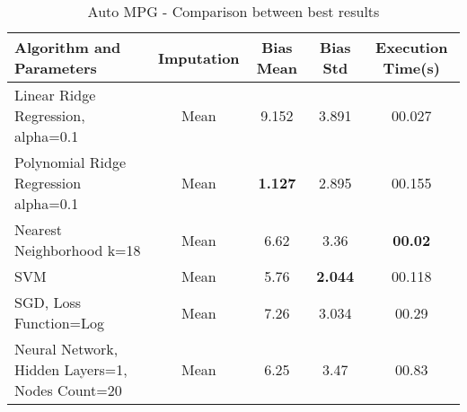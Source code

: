 		\begin{table}[p]
\begin{center}
\begin{tabular}{|p{4cm}|c|c|c|c|}
\hline Algorithm and Parameters & Imputation & Bias Mean & Bias Std & Execution Time(s)\\

\hline Linear Ridge Regression, alpha=0.1 & Mean & 9.152 & 3.891 & 00.027 \\

\hline Polynomial Ridge Regression alpha=0.1 & Mean & \textbf{1.127} & 2.895 & 00.155  \\

\hline Nearest Neighborhood k=18 & Mean & 6.62 & 3.36 & \textbf{00.02}  \\

\hline SVM & Mean & 5.76 & \textbf{2.044} & 00.118  \\

\hline SGD, Loss Function=Log & Mean & 7.26 & 3.034 & 00.29  \\

\hline Neural Network, Hidden Layers=1, Nodes Count=20 & Mean & 6.25 & 3.47 & 00.83  \\

\hline
\end{tabular}
    \caption{Auto MPG - Comparison between best results}
    \label{table:db1-results}
\end{center}
    \end{table}

